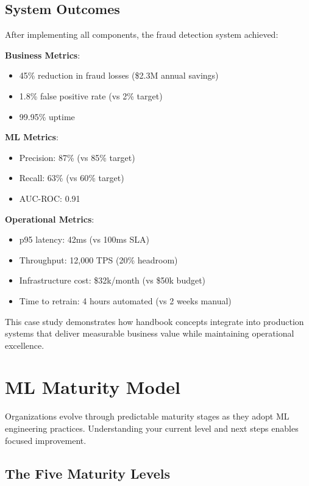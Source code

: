 \subsection{System Outcomes}

After implementing all components, the fraud detection system achieved:

\textbf{Business Metrics}:
\begin{itemize}
    \item 45\% reduction in fraud losses (\$2.3M annual savings)
    \item 1.8\% false positive rate (vs 2\% target)
    \item 99.95\% uptime
\end{itemize}

\textbf{ML Metrics}:
\begin{itemize}
    \item Precision: 87\% (vs 85\% target)
    \item Recall: 63\% (vs 60\% target)
    \item AUC-ROC: 0.91
\end{itemize}

\textbf{Operational Metrics}:
\begin{itemize}
    \item p95 latency: 42ms (vs 100ms SLA)
    \item Throughput: 12,000 TPS (20\% headroom)
    \item Infrastructure cost: \$32k/month (vs \$50k budget)
    \item Time to retrain: 4 hours automated (vs 2 weeks manual)
\end{itemize}

This case study demonstrates how handbook concepts integrate into production systems that deliver measurable business value while maintaining operational excellence.

\section{ML Maturity Model}

Organizations evolve through predictable maturity stages as they adopt ML engineering practices. Understanding your current level and next steps enables focused improvement.

\subsection{The Five Maturity Levels}

